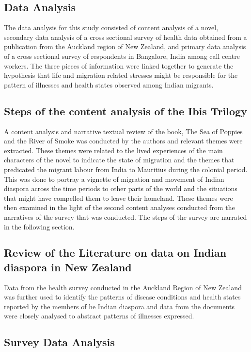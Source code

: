 \subsection*{Data Analysis}

The data analysis for this study consisted of content analysis of a novel, secondary data analysis of a cross sectional survey of health data obtained from a publication from the Auckland region of New Zealand, and primary data analysis of a cross sectional survey of respondents in Bangalore, India among call centre workers. The three pieces of information were linked together to generate the hypothesis that life and migration related stresses might be responsible for the pattern of illnesses and health states observed among Indian migrants.

\subsection*{Steps of the content analysis of the Ibis Trilogy}

A content analysis and narrative textual review of the book, The Sea of Poppies and the River of Smoke was conducted by the authors and relevant themes were extracted. These themes were related to the lived experiences of the main characters of the novel to indicate the state of migration and the themes that predicated the migrant labour from India to  Mauritius during the colonial period. This was done to portray a vignette of migration and movement of Indian diaspora across the time periods to other parts of the world and the situations that might have compelled them to leave their homeland. These themes were then examined in the light of the second content analyses conducted from the narratives of the survey that was conducted. The steps of the survey are narrated in the following section.

\subsection*{Review of the Literature on data on Indian diaspora in New Zealand}

Data from the health survey conducted in the Auckland Region of New Zealand was further used to identify the patterns of disease conditions and health states reported by the members of he Indian diaspora and data from the documents were closely analysed to abstract patterns of illnesses expressed. 

\subsection*{Survey Data Analysis}

